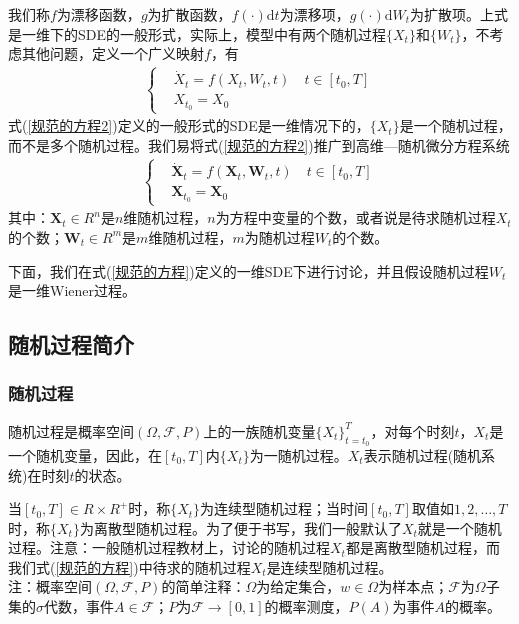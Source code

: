         \par
        我们称$f$为漂移函数，$g$为扩散函数，$f(\cdot)\mathrm{d}t$为漂移项，$g(\cdot)\mathrm{d}W_t$为扩散项。上式是一维下的SDE的一般形式，实际上，模型中有两个随机过程$\{X_t\}$和$\{W_t\}$，不考虑其他问题，定义一个广义映射$f$，有
        \begin{align}
            \label{规范的方程2}
            \left\{
                \begin{aligned}
                        &\dot{X}_t = f(X_t,W_t,t) \quad t\in [t_0,T]\\
                        &X_{t_0} = X_0
                \end{aligned}
            \right.
        \end{align}
        式(\ref{规范的方程2})定义的一般形式的SDE是一维情况下的，$\{X_t\}$是一个随机过程，而不是多个随机过程。我们易将式(\ref{规范的方程2})推广到高维—随机微分方程系统
        \begin{align*}
            \left\{
                \begin{aligned}
                        &\dot{\mathbf{X}}_t = f(\mathbf{X}_t,\mathbf{W}_t,t) \quad t\in [t_0,T]\\
                        &\mathbf{X}_{t_0} = \mathbf{X}_0
                \end{aligned}
            \right.
        \end{align*}
        其中：$\mathbf{X}_t\in R^n$是$n$维随机过程，$n$为方程中变量的个数，或者说是待求随机过程$X_t$的个数；$\mathbf{W}_t\in R^m$是$m$维随机过程，$m$为随机过程$W_t$的个数。
        \par
        下面，我们在式(\ref{规范的方程})定义的一维SDE下进行讨论，并且假设随机过程$W_t$是一维Wiener过程。
    \subsection{随机过程简介}
        \label{subsec:随机过程简介}

        \subsubsection{随机过程}
            \label{subsubsec:随机过程}
            \par
            随机过程是概率空间$(\Omega, \mathcal{F},P)$上的一族随机变量$\{X_t\}_{t = t_0}^T$，对每个时刻$t$，$X_t$是一个随机变量，因此，在$[t_0,T]$内$\{X_t\}$为一随机过程。$X_t$表示随机过程(随机系统)在时刻$t$的状态。
            \par
            当$[t_0,T] \in R\times R^+$时，称$\{X_t\}$为连续型随机过程；当时间$[t_0,T]$取值如$1,2,\dots,T$时，称$\{X_t\}$为离散型随机过程。为了便于书写，我们一般默认了$X_t$就是一个随机过程。注意：一般随机过程教材上，讨论的随机过程$X_t$都是离散型随机过程，而我们式(\ref{规范的方程})中待求的随机过程$X_t$是连续型随机过程。\\
            注：概率空间$(\Omega, \mathcal{F},P)$的简单注释：$\Omega$为给定集合，$w \in \Omega$为样本点；$\mathcal{F}$为$\Omega$子集的$\sigma$代数，事件$A\in \mathcal{F}$；$P$为$\mathcal{F} \rightarrow [0,1]$的概率测度，$P(A)$为事件$A$的概率。
